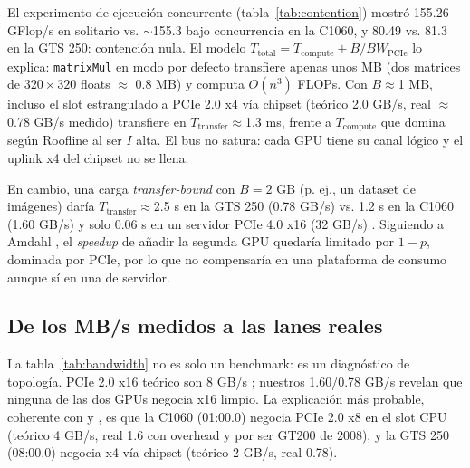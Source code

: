 El experimento de ejecución concurrente (tabla~\ref{tab:contention}) mostró 155.26 GFlop/s en solitario vs. $\sim$155.3 bajo concurrencia en la C1060, y 80.49 vs. 81.3 en la GTS 250: contención nula. El modelo $T_{\text{total}} = T_{\text{compute}} + B/BW_{\text{PCIe}}$ lo explica: \texttt{matrixMul} en modo por defecto transfiere apenas unos MB (dos matrices de $320\times320$ floats $\approx$ 0.8 MB) y computa $O(n^3)$ FLOPs. Con $B\approx$1 MB, incluso el slot estrangulado a PCIe 2.0 x4 vía chipset (teórico 2.0 GB/s, real $\approx$0.78 GB/s medido) transfiere en $T_{\text{transfer}} \approx$1.3 ms, frente a $T_{\text{compute}}$ que domina según Roofline \cite{williams2009roofline} al ser $I$ alta. El bus no satura: cada GPU tiene su canal lógico y el uplink x4 del chipset \cite{ryzen_pcie_lanes,asusx670e} no se llena.

En cambio, una carga \textit{transfer-bound} con $B=2$ GB (p. ej., un dataset de imágenes) daría $T_{\text{transfer}}\approx$2.5 s en la GTS 250 (0.78 GB/s) vs. 1.2 s en la C1060 (1.60 GB/s) y solo 0.06 s en un servidor PCIe 4.0 x16 (32 GB/s) \cite{pcisig2022}. Siguiendo a Amdahl \cite{amdahl1967}, el \textit{speedup} de añadir la segunda GPU quedaría limitado por $1-p$, dominada por PCIe, por lo que no compensaría en una plataforma de consumo aunque sí en una de servidor.

\subsection{De los MB/s medidos a las lanes reales}

La tabla~\ref{tab:bandwidth} no es solo un benchmark: es un diagnóstico de topología. PCIe 2.0 x16 teórico son 8 GB/s \cite{pcisig2022}; nuestros 1.60/0.78 GB/s revelan que ninguna de las dos GPUs negocia x16 limpio. La explicación más probable, coherente con \cite{amd7950x} y \cite{asusx670e}, es que la C1060 (01:00.0) negocia PCIe 2.0 x8 en el slot CPU (teórico 4 GB/s, real 1.6 con overhead y por ser GT200 de 2008), y la GTS 250 (08:00.0) negocia x4 vía chipset (teórico 2 GB/s, real 0.78).

